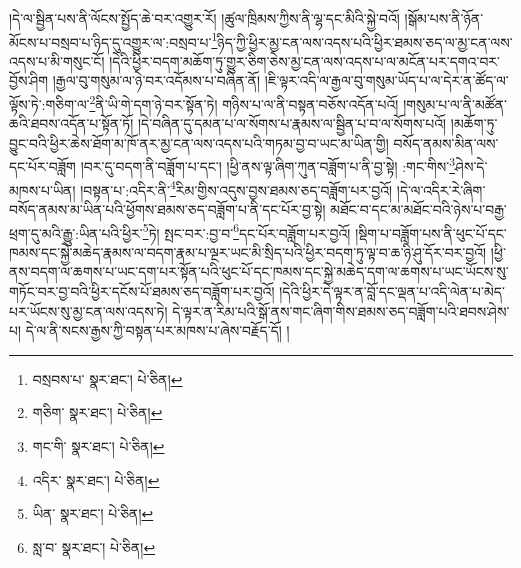 །དེ་ལ་སྦྱིན་པས་ནི་ལོངས་སྤྱོད་ཆེ་བར་འགྱུར་རོ། །ཚུལ་ཁྲིམས་ཀྱིས་ནི་ལྷ་དང་མིའི་སྐྱེ་བའོ། །སྒོམ་པས་ནི་ཉོན་མོངས་པ་བསྲབ་པ་ཉིད་དུ་འགྱུར་ལ་:བསྲབ་པ་\footnote{བསྲབས་པ་  སྣར་ཐང་།  པེ་ཅིན། }ཉིད་ཀྱི་ཕྱིར་མྱ་ངན་ལས་འདས་པའི་ཕྱིར་ཐམས་ཅད་ལ་མྱ་ངན་ལས་འདས་པ་མི་གསུང་ངོ། །དེའི་ཕྱིར་བདག་མཆོག་ཏུ་གྱུར་ཅིག་ཅེས་མྱ་ངན་ལས་འདས་པ་ལ་མངོན་པར་དགའ་བར་བྱོས་ཤིག །རྒྱལ་བུ་གསུམ་ལ་ཉེ་བར་འདོམས་པ་བཞིན་ནོ། །ཇི་ལྟར་འདི་ལ་རྒྱལ་བུ་གསུམ་ཡོད་པ་ལ་དེར་ན་ཚོད་ལ་ལྟོས་ཏེ་:གཅིག་ལ་\footnote{གཅིག་  སྣར་ཐང་།  པེ་ཅིན། }ནི་ཡི་གེ་དག་ཉེ་བར་སྟོན་ཏེ། གཉིས་པ་ལ་ནི་བསྟན་བཅོས་འདོན་པའོ། །གསུམ་པ་ལ་ནི་མཚོན་ཆའི་ཐབས་འདོན་པ་སྟོན་ཏོ། །དེ་བཞིན་དུ་དམན་པ་ལ་སོགས་པ་རྣམས་ལ་སྦྱིན་པ་བ་ལ་སོགས་པའོ། །མཆོག་ཏུ་བྱུང་བའི་ཕྱིར་ཆེས་ཐོག་མ་ཁོ་ནར་མྱ་ངན་ལས་འདས་པའི་གཏམ་བྱ་བ་ཡང་མ་ཡིན་གྱི། བསོད་ནམས་མིན་ལས་དང་པོར་བཟློག །བར་དུ་བདག་ནི་བཟློག་པ་དང་། །ཕྱི་ནས་ལྟ་ཞིག་ཀུན་བཟློག་པ་ནི་བྱ་སྟེ། :གང་གིས་\footnote{གང་གི་  སྣར་ཐང་།  པེ་ཅིན། }ཤེས་དེ་མཁས་པ་ཡིན། །བསྟན་པ་:འདིར་ནི་\footnote{འདིར་  སྣར་ཐང་།  པེ་ཅིན། }རིམ་གྱིས་འདུས་བྱས་ཐམས་ཅད་བཟློག་པར་བྱའོ། །དེ་ལ་འདིར་རེ་ཞིག་བསོད་ནམས་མ་ཡིན་པའི་ཕྱོགས་ཐམས་ཅད་བཟློག་པ་ནི་དང་པོར་བྱ་སྟེ། མཐོང་བ་དང་མ་མཐོང་བའི་ཉེས་པ་བརྒྱ་ཕྲག་དུ་མའི་རྒྱུ་:ཡིན་པའི་ཕྱིར་\footnote{ཡིན་  སྣར་ཐང་།  པེ་ཅིན། }ཏེ། སྤང་བར་:བྱ་བ་\footnote{སླ་བ་  སྣར་ཐང་།  པེ་ཅིན། }དང་པོར་བཟློག་པར་བྱའོ། །སྡིག་པ་བཟློག་པས་ནི་ཕུང་པོ་དང་ཁམས་དང་སྐྱེ་མཆེད་རྣམས་ལ་བདག་རྣམ་པ་ལྔར་ཡང་མི་སྲིད་པའི་ཕྱིར་བདག་ཏུ་ལྟ་བ་ཆ་ཉི་ཤུ་དོར་བར་བྱའོ། །ཕྱི་ནས་བདག་ལ་ཆགས་པ་ཡང་དག་པར་སྟོན་པའི་ཕུང་པོ་དང་ཁམས་དང་སྐྱེ་མཆེད་དག་ལ་ཆགས་པ་ཡང་ཡོངས་སུ་གཏོང་བར་བྱ་བའི་ཕྱིར་དངོས་པོ་ཐམས་ཅད་བཟློག་པར་བྱའོ། །དེའི་ཕྱིར་དེ་ལྟར་ན་བློ་དང་ལྡན་པ་འདི་ལེན་པ་མེད་པར་ཡོངས་སུ་མྱ་ངན་ལས་འདས་ཏེ། དེ་ལྟར་ན་རིམ་པའི་སྒོ་ནས་གང་ཞིག་གིས་ཐམས་ཅད་བཟློག་པའི་ཐབས་ཤེས་པ། དེ་ལ་ནི་སངས་རྒྱས་ཀྱི་བསྟན་པར་མཁས་པ་ཞེས་བརྗོད་དོ། །
